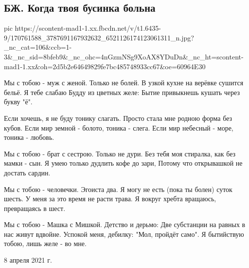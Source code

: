  
 
 
 
 
\subsection{БЖ. Когда твоя бусинка больна}
\label{sec:08_04_2021.fb.bilchenko_evgenia.1.businka}


\ifcmt
  pic https://scontent-mad1-1.xx.fbcdn.net/v/t1.6435-9/170761588_3787691167932632_6521126174123061311_n.jpg?_nc_cat=106&ccb=1-3&_nc_sid=8bfeb9&_nc_ohc=4nGzmNSg9XoAX8YDuDn&_nc_ht=scontent-mad1-1.xx&oh=2d5b2e64649829fe7bc485748933cc67&oe=60964E30
\fi


Мы с тобою - муж с женой. Только не болей.
В узкой кухне на верёвке сушится бельё.
Я тебе слабаю Будду из цветных желе:
Бытие привыкнешь кушать через букву "ё".

Если хочешь, я не буду тонику слагать.
Просто стала мне родною форма без кубов.
Если мир земной - болото, тоника - слега.
Если мир небесный - море, тоника - любовь.

Мы с тобою - брат с сестрою. Только не дури.
Без тебя моя стиралка, как без мамки - сын.
Я умею только дудлить кофе до зари,
Потому что открывашкой не достать сардин.

Мы с тобою - человечки. Эгоиста два.
Я могу не есть (пока ты болен) суток шесть.
У меня за это время не расти трава.
Я вокруг хребта вращаюсь, превращаясь в шест.

Мы с тобою - Машка с Мишкой. Детство и дерьмо:
Две субстанции на равных в нас живут вдвойне.
Успокой меня, дебилку: "Мол, пройдёт само".
Я бытийствую тобою, лишь желе - во мне. 

8 апреля 2021 г.
